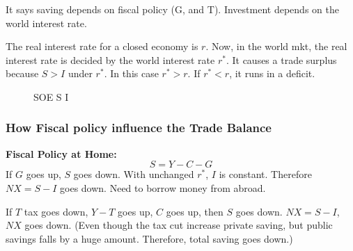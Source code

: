 \documentclass[12pt]{article}
\newcommand{\incfig}[1]{%
\def\svgwidth{\columnwidth}
{#1.pdf_tex}
}
\begin{document}
It says saving depends on fiscal policy (G, and T). Investment depends on the
world interest rate.


The real interest rate for a closed economy is $ r $. Now, in the world mkt, 
the real interest rate is decided by the world interest rate $ r^{*} $. It
causes a trade surplus because $ S > I $ under $ r^{*} $.
In this case $ r^{*} > r $. If $ r^{*} < r $, it runs in a deficit.\\

\begin{figure}[ht]
    \centering
		\scalebox{0.7}{\incfig{soe-s-i}}
    \caption{SOE S I}
    \label{fig:soe-s-i}
\end{figure}



\subsubsection{How Fiscal policy influence the Trade Balance}
{\textbf {Fiscal Policy at Home:}}\\
\begin{equation*}
S = Y - C - G
\end{equation*}
If $ G $ goes up, $ S $ goes down. With unchanged $ r^{*} $, $ I $ is constant.
Therefore $ NX = S - I $ goes down. Need to borrow money from abroad.

If $ T $ tax goes down, $ Y - T $ goes up, $ C $ goes up, then $ S $ goes down.
$ NX = S - I $, $ NX $ goes down. (Even though the tax cut increase private saving,
but public savings falls by a huge amount. Therefore, total saving goes down.)

\begin{figure}[H]
\end{figure}
\end{document}
